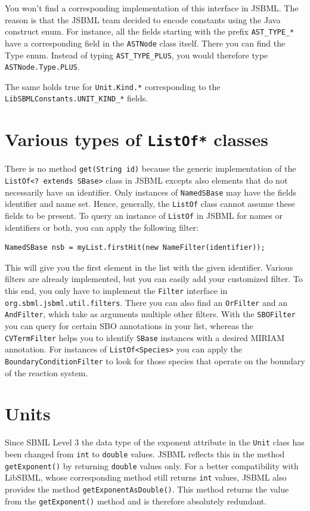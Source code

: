 \documentclass[
  letterpaper,
  11pt,
  headsepline,
  pointlessnumbers,
  tablecaptionabove,
  headinclude,
  appendixprefix,
  idxtotoc,
  bibtotoc
]{scrartcl}
\begin{document}
You won't find a corresponding implementation of this interface in 
JSBML. The reason is that the JSBML team decided to encode constants using the
Java construct enum. For instance, all the fields starting with the
prefix \verb!AST_TYPE_*! have a corresponding field in the \verb!ASTNode! class
itself. There you can find the Type enum. Instead of typing
\verb!AST_TYPE_PLUS!, you would therefore type \verb!ASTNode.Type.PLUS!.

The same holds true for \verb!Unit.Kind.*! corresponding to the 
\verb!LibSBMLConstants.UNIT_KIND_*! fields.


\section{Various types of \texttt{ListOf*} classes}

There is no method \verb!get(String id)! because the generic implementation of 
the \verb!ListOf<? extends SBase>! class in JSBML excepts also elements that do 
not necessarily have an identifier. Only instances of \verb!NamedSBase! may have
the fields identifier and name set. Hence, generally, the \verb!ListOf! class 
cannot assume these fields to be present. To query an instance of \verb!ListOf! 
in JSBML for names or identifiers or both, you can apply the following 
filter:
\begin{verbatim}
NamedSBase nsb = myList.firstHit(new NameFilter(identifier));
\end{verbatim}
This will give you the first element in the list with the given identifier.
Various filters are already implemented, but you can easily add your 
customized filter. To this end, you only have to implement the \verb!Filter! 
interface in \verb!org.sbml.jsbml.util.filters!. There you can also find an
\verb!OrFilter! and an \verb!AndFilter!, which take as arguments multiple other
filters. With the \verb!SBOFilter! you can query for certain SBO annotations in
your list, whereas the \verb!CVTermFilter! helps you to identify \verb!SBase!
instances with a desired MIRIAM annotation. For instances of
\verb!ListOf<Species>! you can apply the \verb!BoundaryConditionFilter! to look
for those species that operate on the boundary of the reaction system.


\section{Units}

Since SBML Level 3 the data type of the exponent attribute in the \verb!Unit! class
has been changed from \verb!int! to \verb!double! values. JSBML reflects this in
the method \verb!getExponent()! by returning \verb!double! values only. For a
better compatibility with LibSBML, whose corresponding method still returns 
\verb!int! values, JSBML also provides the method \verb!getExponentAsDouble()!.
This method returns the value from the \verb!getExponent()! method and is
therefore absolutely redundant.
\end{document}
